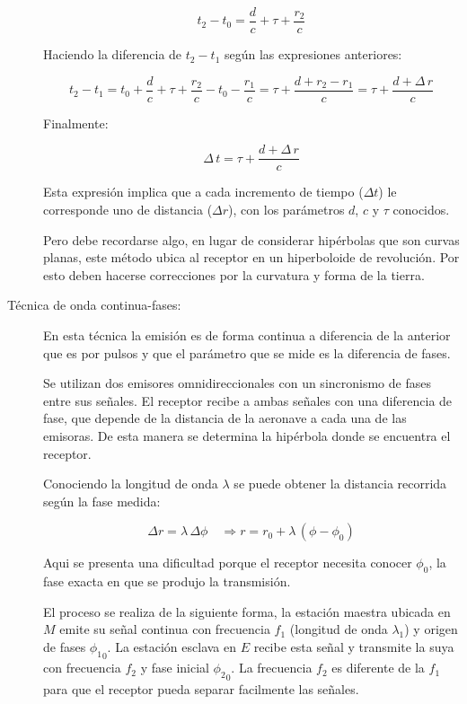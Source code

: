 \begin{description}
\[
t_2-t_0 = \displaystyle \frac{d}{c}+\tau+\frac{r_2}{c}
\]

Haciendo la diferencia de $t_2-t_1$ seg\'un las expresiones anteriores:

\[
t_2-t_1 = t_0 + \displaystyle \frac{d}{c}+\tau+\frac{r_2}{c} - t_0 -\frac{r_1}{c} = \tau+\frac{d+r_2-r_1}{c} = \tau+\frac{d+\Delta\,r}{c}
\]

Finalmente:

\[
\Delta\,t = \tau+\frac{d+\Delta\,r}{c}
\]

Esta expresi\'on implica que a cada incremento de tiempo ($\Delta t$) le corresponde uno de distancia ($\Delta r$), con los par\'ametros $d$, $c$ y $\tau$ conocidos.

Pero debe recordarse algo, en lugar de considerar hip\'erbolas que son curvas planas, este m\'etodo ubica al receptor en un hiperboloide de revoluci\'on. Por esto deben hacerse correcciones por la curvatura y forma de la tierra.


\item [T\'ecnica de onda continua-fases:]

En esta t\'ecnica la emisi\'on es de forma continua a diferencia de la anterior que es por pulsos y que el par\'ametro que se mide es la diferencia de fases.

Se utilizan dos emisores omnidireccionales con un sincronismo de fases entre sus se\~nales. El receptor recibe a ambas se\~nales con una diferencia de fase, que depende de la distancia de la aeronave a cada una de las emisoras. De esta manera se determina la hip\'erbola donde se encuentra el receptor.

Conociendo la longitud de onda $\lambda$ se puede obtener la distancia recorrida seg\'un la fase medida: 

\[\Delta r = \lambda \,\Delta \phi \quad \Longrightarrow r = r_0 +\lambda \,\left( \phi - \phi_0 \right) \]

Aqui se presenta una dificultad porque el receptor necesita conocer $ \phi_0$, la fase exacta en que se produjo la transmisi\'on.

El proceso se realiza de la siguiente forma, la estaci\'on maestra ubicada en $M$ emite su se\~nal continua con frecuencia $f_1$ (longitud de onda $\lambda_1$) y origen de fases $ {\phi_1}_0$. La estaci\'on esclava en $E$ recibe esta se\~nal y transmite la suya con frecuencia $f_2$ y fase inicial $ {\phi_2}_0$. La frecuencia $f_2$ es diferente de la $f_1$ para que el receptor pueda separar facilmente las se\~nales.


\end{description}
